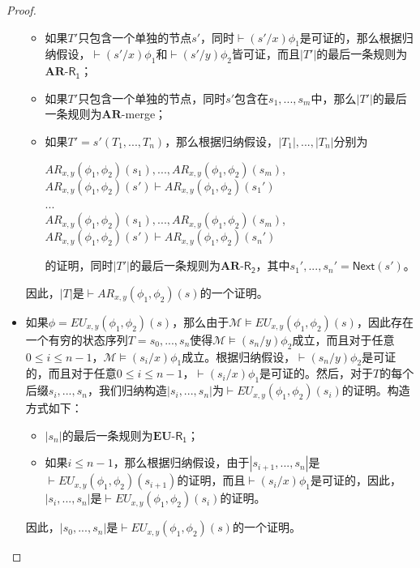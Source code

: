 \begin{proof}
\begin{itemize}
\begin{itemize}
			\item 如果$T'$只包含一个单独的节点$s'$，同时$\vdash (s'/x)\phi_1$是可证的，那么根据归纳假设，$\vdash (s'/x)\phi_1$和$\vdash (s'/y)\phi_2$皆可证，而且$|T'|$的最后一条规则为$\mathbf{AR}$-$\mathsf{R_1}$；

			\item 如果$T'$只包含一个单独的节点，同时$s'$包含在$s_1,...,s_m$中，那么$|T'|$的最后一条规则为$\mathbf{AR}$-merge；
			
			\item 如果$T' = s'(T_1, ..., T_n)$，那么根据归纳假设，$|T_1|,...,|T_n|$分别为
			\begin{center}
				$AR_{x,y}(\phi_1,\phi_2)(s_1),...,AR_{x,y}(\phi_1,\phi_2)(s_m)$, \\$AR_{x,y}(\phi_1,\phi_2)(s')\vdash AR_{x, y}(\phi_1,\phi_2)(s_1')$\\
				...\\
				$AR_{x,y}(\phi_1,\phi_2)(s_1),...,AR_{x,y}(\phi_1,\phi_2)(s_m)$, \\$AR_{x,y}(\phi_1,\phi_2)(s')\vdash AR_{x, y}(\phi_1,\phi_2)(s_n')$
			\end{center}
			的证明，同时$|T'|$的最后一条规则为$\mathbf{AR}$-$\mathsf{R_2}$，其中$s_1',...,s_n'=\mathsf{Next}(s')$。
			
		\end{itemize}
		
		因此，$|T|$是$\vdash AR_{x,y}(\phi_1,\phi_2)(s)$的一个证明。
		

		\item 如果$\phi = EU_{x,y}(\phi_1, \phi_2)(s)$，那么由于$\mathcal{M}\models EU_{x,y}(\phi_1, \phi_2)(s)$，因此存在一个有穷的状态序列$T = s_0, ..., s_n$使得$\mathcal{M}\models (s_n/y)\phi_2$成立，而且对于任意$0\le i\le n-1$，$\mathcal{M}\models (s_i/x)\phi_1$成立。根据归纳假设，$\vdash (s_n/y)\phi_2$是可证的，而且对于任意$0\le i\le n-1$，$\vdash (s_i/x)\phi_1$是可证的。然后，对于$T$的每个后缀$s_i,...,s_n$，我们归纳构造$|s_i, ..., s_n|$为$\vdash EU_{x,y}(\phi_1, \phi_2)(s_i)$的证明。构造方式如下：
		
		\begin{itemize}

			\item $|s_n|$的最后一条规则为$\mathbf{EU}$-$\mathsf{R_1}$；

			
			\item 如果$i\le n-1$，那么根据归纳假设，由于$|s_{i+1},...,s_n|$是$\vdash EU_{x,y}(\phi_1,\phi_2)(s_{i+1})$的证明，而且$\vdash (s_i/x)\phi_1$是可证的，因此，$|s_i,...,s_n|$是$\vdash EU_{x,y}(\phi_1, \phi_2)(s_i)$的证明。
		\end{itemize}

		
		因此，$|s_0,...,s_n|$是$\vdash EU_{x,y}(\phi_1,\phi_2)(s)$的一个证明。
	\end{itemize}
	
\end{proof}


